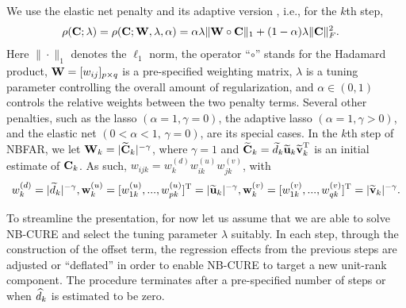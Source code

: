 \documentclass[12pt]{article}
\def\trans{^{\rm T}}
\begin{document}
We use the elastic net penalty and its adaptive version \citep{zou2005,zou2009adaptive,mishra2017sequential}, i.e., for the $k$th step, 
\begin{align}
\rho(\C;\lambda) = \rho(\C;\W,\lambda,\alpha)& =\alpha\lambda\|\W\circ\C\|_1 + (1-\alpha)\lambda\|\C\|_F^2. \label{sec2:eq:enet} %
\end{align}
Here $\|\cdot\|_1$ denotes the $\ell_1$ norm, the operator ``$\circ$'' stands for the Hadamard product, ${\bf W}=[w_{ij}]_{p\times q}$ is a pre-specified weighting matrix, $\lambda$ is a tuning parameter controlling the overall amount of regularization, and $\alpha \in (0,1)$ controls the relative weights between the two penalty terms.  {%
Several other penalties, such as the lasso $(\alpha = 1, \gamma = 0)$, the adaptive lasso $(\alpha = 1,  \gamma > 0)$, and the elastic net $(0 < \alpha < 1,\, \gamma = 0)$, are its special cases. }
In the $k$th step of NBFAR, we let ${\bf W}_k = |\widetilde{{\bf C}}_k|^{-\gamma}$, where $\gamma =1$ and $\widetilde{\C}_k= \widetilde{d}_k\widetilde{\bu}_k\widetilde{\bv}_k\trans$ is an initial estimate of ${\bf C}_k$. As such, $w_{ijk} = w_k^{(d)} w_{ik}^{(u)} w_{jk}^{(v)}$, with
\begin{align}
w_k^{(d)} = |\widetilde{d}_k|^{-\gamma},
\bw_k^{(u)} = [w_{1k}^{(u)},..., w_{pk}^{(u)}]\trans= |\widetilde{\bu}_k|^{-\gamma},
\bw_k^{(v)} = [w_{1k}^{(v)},..., w_{qk}^{(v)}]\trans= |\widetilde{\bv}_k|^{-\gamma}. \label{sec2:weights}
\end{align}




To streamline the presentation, for now let us assume that we are able to solve NB-CURE and select the tuning parameter $\lambda$ suitably. 
In each step, through the construction of the offset term, the regression effects from the previous steps are adjusted or ``deflated'' in order to enable NB-CURE  to target  a new unit-rank component.  The procedure terminates after a pre-specified number of steps or when $\widehat{d}_k$ is estimated to be zero. 
\end{document}
